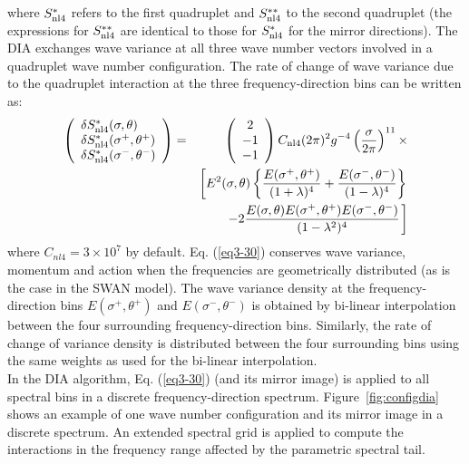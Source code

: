 \documentclass[12pt]{book}
\begin{document}
where $S_{\rm nl4}^{*}$ refers to the first quadruplet and $S_{\rm nl4}^{**}$ to the second quadruplet
(the expressions for $S_{\rm nl4}^{**}$ are identical to those for $S_{\rm nl4}^{*}$ for the mirror directions).
The DIA exchanges wave variance at all three wave number vectors involved in a quadruplet
wave number configuration. The rate of change of wave variance due to the quadruplet
interaction at the three frequency-direction bins can be written as:
\begin{eqnarray}
  \left(
     \begin{array}{l}
        \delta S^*_{\rm nl4} (\sigma,\theta) \\
        \delta S^*_{\rm nl4} (\sigma^+,\theta^+) \\
        \delta S^*_{\rm nl4} (\sigma^-,\theta^-)
     \end{array}
  \right)
  &=&
  \left(
     \begin{array}{c}
        2 \\
       -1 \\
       -1
     \end{array}
  \right)
  C_{\rm nl4} (2\pi)^2 g^{-4} \left(\frac{\sigma}{2\pi} \right)^{11} \times \nonumber \\
  &&\left[E^2 (\sigma,\theta) \left\{\frac{E(\sigma^+,\theta^+)}{(1+\lambda)^4} +
  \frac{E(\sigma^{-},\theta^-)}{(1-\lambda)^4} \right\} \right. \nonumber \\
  &&\left. \left. -2\frac{E(\sigma,\theta) E(\sigma^+,\theta^+) E(\sigma^-,\theta^-)}{(1-\lambda^2)^4}
    \right. \right]
  \label{eq3-30}
\end{eqnarray}
where $C_{nl4} = 3 \times 10^7$ by default.
Eq. (\ref{eq3-30}) conserves wave variance, momentum and
action when the frequencies are geometrically distributed (as is the case in the SWAN
model). The wave variance density at the frequency-direction bins $E(\sigma^+,\theta^+)$ and $E(\sigma^-,\theta^-)$ is
obtained by bi-linear interpolation between the four surrounding frequency-direction bins.
Similarly, the rate of change of variance density is distributed between the four surrounding
bins using the same weights as used for the bi-linear interpolation.
\\[2ex]
\noindent
In the DIA algorithm, Eq. (\ref{eq3-30}) (and its mirror image) is applied to all spectral bins in a
discrete frequency-direction spectrum. Figure~\ref{fig:configdia} shows an example of one wave number
configuration and its mirror image in a discrete spectrum. An extended spectral grid is applied
to compute the interactions in the frequency range affected by the parametric spectral tail.
\end{document}

